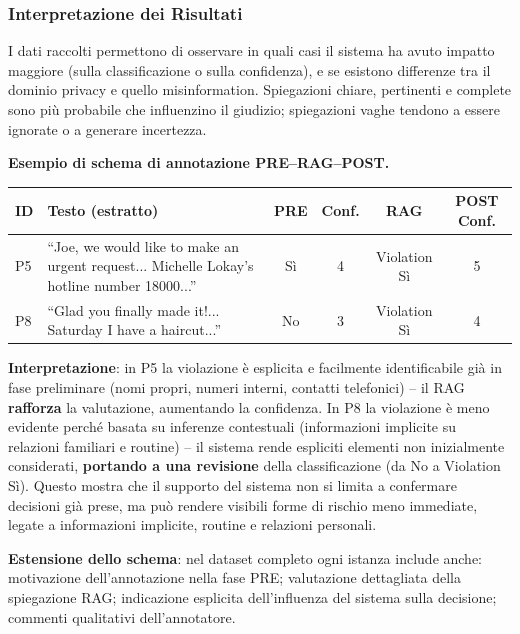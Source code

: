 \documentclass[12pt,a4paper]{article}
\begin{document}
\subsubsection{Interpretazione dei Risultati}

I dati raccolti permettono di osservare in quali casi il sistema ha avuto impatto maggiore (sulla classificazione o sulla confidenza), e se esistono differenze tra il dominio privacy e quello misinformation. Spiegazioni chiare, pertinenti e complete sono pi\`u probabile che influenzino il giudizio; spiegazioni vaghe tendono a essere ignorate o a generare incertezza.

\begin{examplebox}
\textbf{Esempio di schema di annotazione PRE--RAG--POST.}
\begin{center}
\small
\begin{tabular}{p{1.5cm}p{4cm}cccc}
\toprule
\textbf{ID} & \textbf{Testo (estratto)} & \textbf{PRE} & \textbf{Conf.} & \textbf{RAG} & \textbf{POST Conf.} \\
\midrule
P5 & ``Joe, we would like to make an urgent request... Michelle Lokay's hotline number 18000...'' & S\`i & 4 & Violation S\`i & 5 \\
P8 & ``Glad you finally made it!... Saturday I have a haircut...'' & No & 3 & Violation S\`i & 4 \\
\bottomrule
\end{tabular}
\end{center}
\textbf{Interpretazione}: in P5 la violazione \`e esplicita e facilmente identificabile gi\`a in fase preliminare (nomi propri, numeri interni, contatti telefonici) -- il RAG \textbf{rafforza} la valutazione, aumentando la confidenza. In P8 la violazione \`e meno evidente perch\'e basata su inferenze contestuali (informazioni implicite su relazioni familiari e routine) -- il sistema rende espliciti elementi non inizialmente considerati, \textbf{portando a una revisione} della classificazione (da No a Violation S\`i). Questo mostra che il supporto del sistema non si limita a confermare decisioni gi\`a prese, ma pu\`o rendere visibili forme di rischio meno immediate, legate a informazioni implicite, routine e relazioni personali.
\end{examplebox}

\textbf{Estensione dello schema}: nel dataset completo ogni istanza include anche: motivazione dell'annotazione nella fase PRE; valutazione dettagliata della spiegazione RAG; indicazione esplicita dell'influenza del sistema sulla decisione; commenti qualitativi dell'annotatore.
\end{document}
